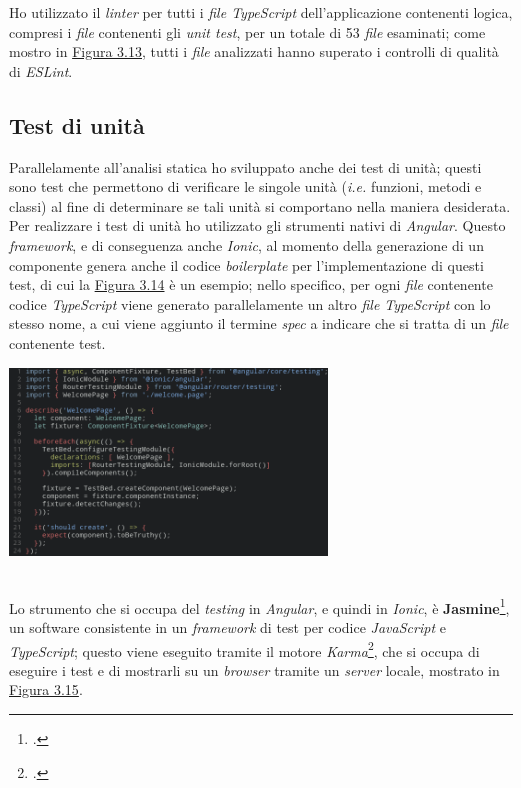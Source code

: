 Ho utilizzato il \textit{linter} per tutti i \textit{file TypeScript} dell'applicazione contenenti logica, compresi i \textit{file} contenenti gli \textit{unit test}, per un totale di 53 \textit{file} esaminati; come mostro in \hyperref[img:nglint]{Figura 3.13}, tutti i \textit{file} analizzati hanno superato i controlli di qualità di \textit{ESLint}.

\subsection{Test di unità}

Parallelamente all'analisi statica ho sviluppato anche dei test di unità; questi sono test che permettono di verificare le singole unità (\textit{i.e.} funzioni, metodi e classi) al fine di determinare se tali unità si comportano nella maniera desiderata. \\
Per realizzare i test di unità ho utilizzato gli strumenti nativi di \textit{Angular}. Questo \textit{framework}, e di conseguenza anche \textit{Ionic}, al momento della generazione di un componente genera anche il codice \textit{boilerplate} per l'implementazione di questi test, di cui la \hyperref[img:jasminetest]{Figura 3.14} è un esempio; nello specifico, per ogni \textit{file} contenente codice \textit{TypeScript} viene generato parallelamente un altro \textit{file TypeScript} con lo stesso nome, a cui viene aggiunto il termine \textit{spec} a indicare che si tratta di un \textit{file} contenente test. \\

\begin{minipage}{\linewidth}
  \label{img:jasminetest}
  \centering
    \includegraphics[height=5cm]{immagini/jasminetest}
\end{minipage} \\

Lo strumento che si occupa del \textit{testing} in \textit{Angular}, e quindi in \textit{Ionic}, è \textbf{Jasmine}\footcite{tec:jasmine}, un software consistente in un \textit{framework} di test per codice \textit{JavaScript} e \textit{TypeScript}; questo viene eseguito tramite il motore \textit{Karma}\footcite{tec:karma}, che si occupa di eseguire i test e di mostrarli su un \textit{browser} tramite un \textit{server} locale, mostrato in \hyperref[img:jasminekarma]{Figura 3.15}.

